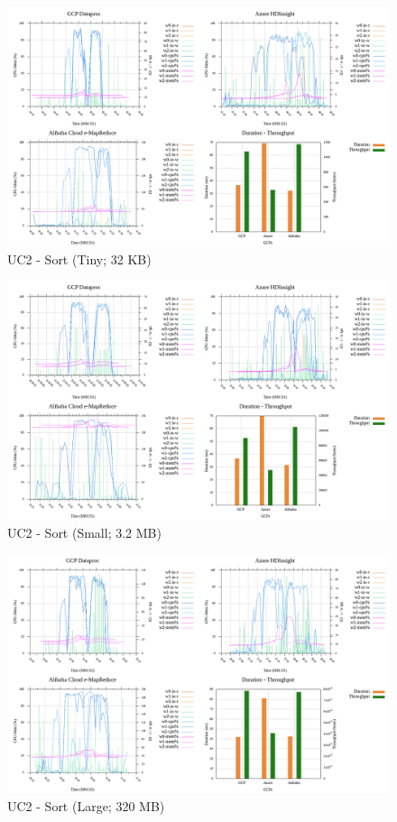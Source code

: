 \documentclass[review]{elsarticle}
\begin{document}
\begin{figure}[p]
	\caption{UC2 - Sort (Tiny; 32 KB)}
	\label{fig:uc2-srt-t-cmidt}
	\includegraphics[width=\textwidth]{uc2-srt-t-cmidt}
	\centering
\end{figure}

\begin{figure}[p]
	\caption{UC2 - Sort (Small; 3.2 MB)}
	\label{fig:uc2-srt-s-cmidt}
	\includegraphics[width=\textwidth]{uc2-srt-s-cmidt}
	\centering
\end{figure}

\begin{figure}[p]
	\caption{UC2 - Sort (Large; 320 MB)}
	\label{fig:uc2-srt-l-cmidt}
	\includegraphics[width=\textwidth]{uc2-srt-l-cmidt}
	\centering
\end{figure}
\end{document}
